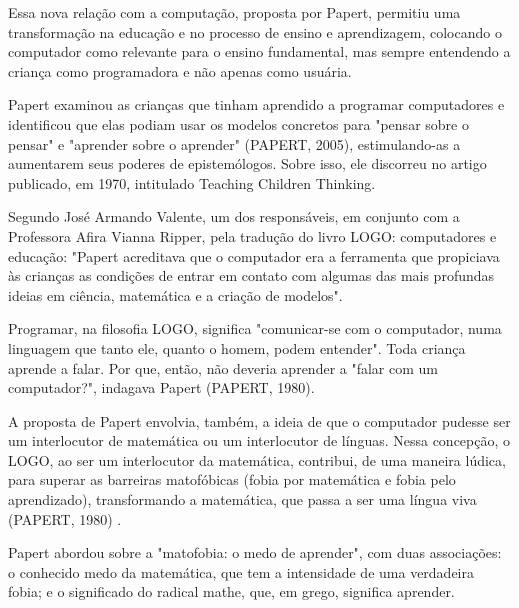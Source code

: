 Essa nova relação com a computação, proposta por Papert, permitiu uma transformação na educação e no processo de ensino e aprendizagem, colocando o computador como relevante para o ensino fundamental, mas sempre entendendo a criança como programadora e não apenas como usuária.

Papert examinou as crianças que tinham aprendido a programar computadores e identificou que elas podiam usar os modelos concretos para "pensar sobre o pensar" e "aprender sobre o aprender"  (PAPERT, 2005), estimulando-as  a aumentarem seus poderes de epistemólogos. Sobre isso, ele discorreu no artigo publicado, em 1970, intitulado Teaching Children Thinking.

Segundo José Armando Valente, um dos responsáveis, em conjunto com a Professora Afira Vianna Ripper, pela tradução do livro LOGO: computadores e educação: "Papert acreditava que o computador era a ferramenta que propiciava às crianças as condições de entrar em contato com algumas das mais profundas ideias em ciência, matemática e a criação de modelos".

Programar, na filosofia LOGO, significa "comunicar-se com o computador, numa linguagem que tanto ele, quanto o homem,  podem entender". Toda criança aprende a falar. Por que, então, não deveria aprender a "falar com um computador?", indagava Papert  (PAPERT, 1980).

A proposta de Papert envolvia, também, a ideia de que o computador pudesse ser um interlocutor  de matemática ou um interlocutor de línguas. Nessa concepção, o LOGO, ao ser um interlocutor da matemática, contribui, de uma maneira lúdica, para superar as barreiras matofóbicas (fobia por matemática e fobia pelo aprendizado), transformando a matemática, que passa a ser uma língua viva (PAPERT, 1980) .

Papert abordou sobre a "matofobia: o medo de aprender", com duas associações: o conhecido medo da matemática, que tem a intensidade de uma verdadeira fobia; e o  significado do radical mathe, que, em grego, significa aprender.


\noindent\begin{flushright}\mbox{\linespread{1}\selectfont\centering{}}\end{flushright}


